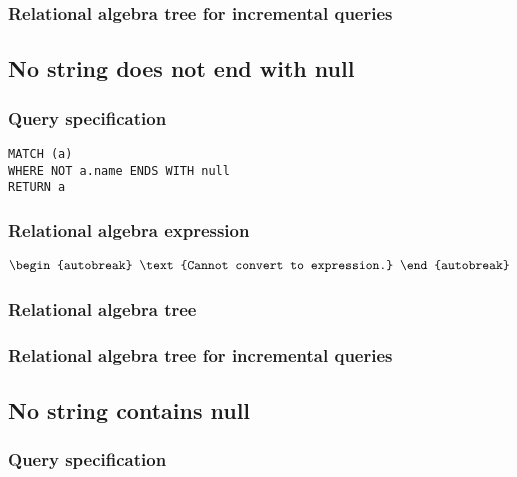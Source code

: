 \subsubsection*{Relational algebra tree for incremental queries}


\subsection{No string does not end with null}

\subsubsection*{Query specification}

\begin{lstlisting}
MATCH (a)
WHERE NOT a.name ENDS WITH null
RETURN a
\end{lstlisting}

\subsubsection*{Relational algebra expression}

\begin{align*}
\begin{autobreak}
\text{Cannot convert to expression.}
\end{autobreak}
\end{align*}

\subsubsection*{Relational algebra tree}


\subsubsection*{Relational algebra tree for incremental queries}


\subsection{No string contains null}

\subsubsection*{Query specification}


